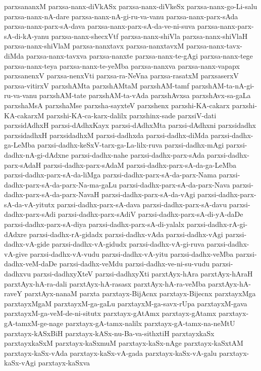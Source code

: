 {parxsananxM
parxsa-nanx-diVkASx
parxsa-nanx-diVkeSx
parxsa-nanx-go-Li-salu
parxsa-nanx-nA-dare
parxsa-nanx-nA-gi-ru-va-vanu
parxsa-nanx-parx-sAda
parxsa-nanx-parx-sA-dava
parxsa-nanx-parx-sA-da-ve-ni-suva
parxsa-nanx-parx-sA-di-kA-yanu
parxsa-nanx-shecxVtf
parxsa-nanx-shiVla
parxsa-nanx-shiVlaH
parxsa-nanx-shiVlaM
parxsa-nanxtavx
parxsa-nanxtavxM
parxsa-nanx-tavx-diMda
parxsa-nanx-tavxva
parxsa-nanxte
parxsa-nanx-te-gAgi
parxsa-nanx-tege
parxsa-nanx-teya
parxsa-nanx-te-yeMba
parxsa-nanxva
parxsa-nanx-vapapx
parxsanenxV
parxsa-nenxVti
parxsa-ra-NeVna
parxsa-rasatxM
parxsaserxV
parxsa-vitirxV
parxshAMta
parxshAMtaM
parxshAM-tamf
parxshAM-ta-nA-gi-ru-va-vanu
parxshAM-tate
parxshAM-ta-vAda
parxshAvxsa
parxshAvx-sa-gaLa
parxshaMsA
parxshaMse
parxsha-sayxteV
parxshenx
parxshi-KA-cakarx
parxshi-KA-cakarxM
parxshi-KA-ca-karx-dalilx
parxshinx-sade
parxsiV-dati
parxsidAdhxH
parxsi-dAdhxKayx
parxsi-dAdhxMta
parxsi-dAdhxni
parxsidadhx
parxsidadhxH
parxsidadhxM
parxsi-dadhxda
parxsi-dadhx-diMda
parxsi-dadhx-ga-LeMba
parxsi-dadhx-keSxV-tarx-ga-La-lilx-ruva
parxsi-dadhx-mAgi
parxsi-dadhx-nA-gi-dAdxne
parxsi-dadhx-nahe
parxsi-dadhx-parx-sAda
parxsi-dadhx-parx-sAdaH
parxsi-dadhx-parx-sAdaM
parxsi-dadhx-parx-sA-da-ga-LeMba
parxsi-dadhx-parx-sA-da-liMga
parxsi-dadhx-parx-sA-da-parx-Nama
parxsi-dadhx-parx-sA-da-parx-Na-ma-gaLu
parxsi-dadhx-parx-sA-da-parx-Nava
parxsi-dadhx-parx-sA-da-parx-NavaH
parxsi-dadhx-parx-sA-da-vAgi
parxsi-dadhx-parx-sA-da-vA-yitutx
parxsi-dadhx-parx-sA-dava
parxsi-dadhx-parx-sA-davu
parxsi-dadhx-parx-sAdi
parxsi-dadhx-parx-sAdiV
parxsi-dadhx-parx-sA-di-yA-daDe
parxsi-dadhx-parx-sA-diya
parxsi-dadhx-parx-sA-di-yalalx
parxsi-dadhx-rA-gi-dAdxre
parxsi-dadhx-rA-gidadx
parxsi-dadhx-vAda
parxsi-dadhx-vAgi
parxsi-dadhx-vA-gide
parxsi-dadhx-vA-gidudx
parxsi-dadhx-vA-gi-ruva
parxsi-dadhx-vA-give
parxsi-dadhx-vA-vudu
parxsi-dadhx-vA-yitu
parxsi-dadhx-veMba
parxsi-dadhx-veM-daDe
parxsi-dadhx-veMdu
parxsi-dadhx-ve-ni-su-vudu
parxsi-dadhxvu
parxsi-dadhxyXteV
parxsi-dadhxyXti
parxtAyx-hAra
parxtAyx-hAraH
parxtAyx-hA-ra-dali
parxtAyx-hA-rasasx
parxtAyx-hA-ra-veMba
parxtAyx-hA-raveY
parxtAyx-nanaM
parxta
parxtayx-BijAcnx
parxtayx-Bijecnx
parxtayxMga
parxtayxMgaM
parxtayxM-ga-gaLu
parxtayxM-ga-savx-rUpa
parxtayxM-gava
parxtayxM-ga-veM-de-ni-situtx
parxtayx-gAtAmx
parxtayx-gAtamx
parxtayx-gA-tamxM-ge-nage
parxtayx-gA-tamx-nalilx
parxtayx-gA-tamx-na-neMtU
parxtayx-kASxBiH
parxtayx-kASx-nu-Ba-va-sithxtiH
parxtayxkaSx
parxtayxkaSxM
parxtayx-kaSxmuM
parxtayx-kaSx-nAge
parxtayx-kaSxtAM
parxtayx-kaSx-vAda
parxtayx-kaSx-vA-gada
parxtayx-kaSx-vA-galu
parxtayx-kaSx-vAgi
parxtayx-kaSxva
}
